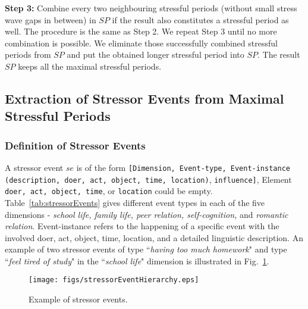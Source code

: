 \textbf{Step 3:} Combine every two neighbouring stressful periods (without small stress wave gaps in between) in $SP$
if the result also constitutes a stressful period as well.
The procedure is the same as Step 2.
We repeat Step 3 until no more combination is possible.
We eliminate those successfully combined stressful periods from $SP$ and
put the obtained longer stressful period into $SP$.
The result $SP$ keeps all the maximal stressful periods.


\subsection{Extraction of Stressor Events from Maximal Stressful Periods}


\subsubsection{Definition of Stressor Events}

A stressor event $se$ is of the form
\texttt{[Dimension, Event-type, Event-instance (description, doer, act, object, time, location)}, \texttt{influence]},
Element \texttt{doer, act, object, time}, or \texttt{location} could be empty.
Table~\ref{tab:stressorEvents} gives different event types in each of the five dimensions -
\emph{school life, family life, peer relation, self-cognition,}
and \emph{romantic relation}.
Event-instance refers to the happening of a specific event with the involved doer, act, object, time, location,
and a detailed linguistic description.
An example of two stressor events of type ``\emph{having too much homework}"
and type ``\emph{feel tired of study}" in the ``\emph{school life}" dimension
is illustrated in Fig.~\ref{fig:stressorEventHierarchy}.
\begin{figure}
\centering
\texttt{[image: figs/stressorEventHierarchy.eps]}
\caption{Example of stressor events.}
\label{fig:stressorEventHierarchy}
\end{figure}

